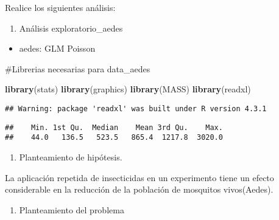 \documentclass[
]{article}
\newenvironment{Shaded}{\begin{snugshade}}{\end{snugshade}}
\newcommand{\AttributeTok}[1]{\textcolor[rgb]{0.13,0.29,0.53}{#1}}
\newcommand{\FunctionTok}[1]{\textcolor[rgb]{0.13,0.29,0.53}{\textbf{#1}}}
\newcommand{\NormalTok}[1]{#1}
\newcommand{\OtherTok}[1]{\textcolor[rgb]{0.56,0.35,0.01}{#1}}
\newcommand{\SpecialCharTok}[1]{\textcolor[rgb]{0.81,0.36,0.00}{\textbf{#1}}}
\newcommand{\StringTok}[1]{\textcolor[rgb]{0.31,0.60,0.02}{#1}}
\providecommand{\tightlist}{%
  \setlength{\itemsep}{0pt}\setlength{\parskip}{0pt}}
\begin{document}
Realice los siguientes análisis:

\begin{enumerate}
\def\labelenumi{\arabic{enumi}.}
\tightlist
\item
  Análisis exploratorio\_aedes
\end{enumerate}

\begin{itemize}
\tightlist
\item
  aedes: GLM Poisson
\end{itemize}

\#Librerias necesarias para data\_aedes

\begin{Shaded}
\begin{Highlighting}[]
\FunctionTok{library}\NormalTok{(stats)}
\FunctionTok{library}\NormalTok{(graphics)}
\FunctionTok{library}\NormalTok{(MASS)}
\FunctionTok{library}\NormalTok{(readxl)}
\end{Highlighting}
\end{Shaded}

\begin{verbatim}
## Warning: package 'readxl' was built under R version 4.3.1
\end{verbatim}

\begin{Shaded}
\end{Shaded}

\begin{verbatim}
##    Min. 1st Qu.  Median    Mean 3rd Qu.    Max. 
##    44.0   136.5   523.5   865.4  1217.8  3020.0
\end{verbatim}

\begin{enumerate}
\def\labelenumi{\arabic{enumi}.}
\setcounter{enumi}{1}
\tightlist
\item
  Planteamiento de hipótesis.
\end{enumerate}

La aplicación repetida de insecticidas en un experimento tiene un efecto
considerable en la reducción de la población de mosquitos vivos(Aedes).

\begin{enumerate}
\def\labelenumi{\arabic{enumi}.}
\setcounter{enumi}{2}
\tightlist
\item
  Planteamiento del problema
\end{enumerate}
\end{document}
